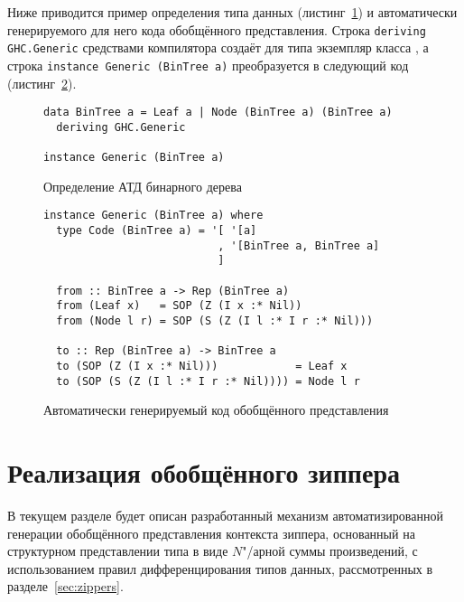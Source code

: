 Ниже приводится пример определения типа данных (листинг~\ref{list:bin-tree}) и автоматически генерируемого для него кода обобщённого представления. Строка \lstinline{deriving GHC.Generic} средствами компилятора создаёт для типа экземпляр класса , а строка \lstinline{instance Generic (BinTree a)} преобразуется в следующий код (листинг~\ref{list:generic-bin-tree}).
\begin{figure}[h]
\begin{framed}
\vspace{-0.25cm}
\begin{lstlisting}
data BinTree a = Leaf a | Node (BinTree a) (BinTree a)
  deriving GHC.Generic

instance Generic (BinTree a)
\end{lstlisting}
\vspace{-0.25cm}
\end{framed}
\caption{Определение АТД бинарного дерева}
\label{list:bin-tree}
\end{figure}

\begin{figure}[h]
\begin{framed}
\vspace{-0.25cm}
\begin{lstlisting}
instance Generic (BinTree a) where
  type Code (BinTree a) = '[ '[a]
                           , '[BinTree a, BinTree a]
                           ]
                           
  from :: BinTree a -> Rep (BinTree a)
  from (Leaf x)   = SOP (Z (I x :* Nil))
  from (Node l r) = SOP (S (Z (I l :* I r :* Nil)))
  
  to :: Rep (BinTree a) -> BinTree a
  to (SOP (Z (I x :* Nil)))            = Leaf x
  to (SOP (S (Z (I l :* I r :* Nil)))) = Node l r
\end{lstlisting}
\vspace{-0.25cm}
\end{framed}
\caption{Автоматически генерируемый код обобщённого представления}
\label{list:generic-bin-tree}
\end{figure}

\section{Реализация обобщённого зиппера}
\label{sec:generic-zippers-sop}

В текущем разделе будет описан разработанный механизм автоматизированной генерации обобщённого представления контекста зиппера, основанный на структурном представлении типа в виде $N$"/арной суммы произведений, с использованием правил дифференцирования типов данных, рассмотренных в разделе~\ref{sec:zippers}.

